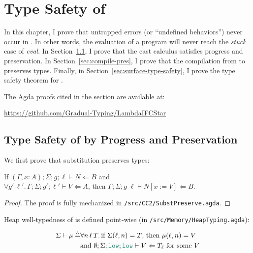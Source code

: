 \chapter{Type Safety of \Surface}
\label{ch:type-safety}

{\color{NavyBlue} %
In this chapter, I prove that untrapped errors (or ``undefined behaviors'')
never occur in \Surface. In other words, the evaluation of a \Surface program
will never reach the \textit{stuck} case of \textit{eval}. In
Section~\ref{sec:cc-type-safety}, I prove that the cast calculus \CC satisfies
progress and preservation. In Section~\ref{sec:compile-pres}, I prove that the
compilation from \Surface to \CC preserves types. Finally, in
Section~\ref{sec:surface-type-safety}, I prove the type safety theorem for
\Surface.

The Agda proofs cited in the section are available at:
\begin{center}
  \url{https://github.com/Gradual-Typing/LambdaIFCStar}
\end{center}

} %

\section{Type Safety of \CC by Progress and Preservation}
\label{sec:cc-type-safety}

We first prove that substitution preserves types:

\begin{lemma}
  \label{lem:subst-pres}
  If $(\Gamma,x{:}A);\Sigma;g;\ell\vdash N \Leftarrow B$ and \\
  $\forall g'\,\ell'.\,\Gamma;\Sigma;g';\ell' \vdash V \Leftarrow A$, then
  $\Gamma;\Sigma;g\;\ell \vdash N[x:=V] \Leftarrow B$.
\end{lemma}
\begin{proof}
  The proof is fully mechanized in \texttt{/src/CC2/SubstPreserve.agda}.
\end{proof}

Heap well-typedness of \CC is defined point-wise (in
\texttt{/src/Memory/HeapTyping.agda}):

\begin{align*}
  \Sigma \vdash \mu \triangleq & \forall n\,\ell\,T.\,\text{if}~\Sigma(\ell,n)=T \text{, then}~\mu(\ell,n)=V \\
  & \text{and}~\emptyset;\Sigma;\low;\low\vdash V \Leftarrow T_{\ell} ~\text{for some}~ V
\end{align*}

